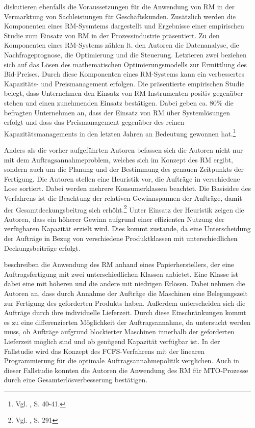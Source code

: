 \cite{kolisch2006revenue} diskutieren ebenfalls die Voraussetzungen für die Anwendung von RM in der Vermarktung von Sachleistungen für Geschäftskunden. Zusätzlich werden die Komponenten eines RM-Sysmtems dargestellt und Ergebnisse einer empirischen Studie zum Einsatz von RM in der Prozessindustrie präsentiert. Zu den Komponenten eines RM-Systems zählen lt. den Autoren die Datenanalyse, die Nachfrageprognose, die Optimierung und die Steuerung. Letzteren zwei beziehen sich auf das Lösen des mathematischen Optimierungsmodells zur Ermittlung des Bid-Preises. Durch diese Komponenten eines RM-Systems kann ein verbessertes Kapazitäts- und Preismanagement erfolgen. Die präsentierte empirischen Studie belegt, dass Unternehmen den Einsatz von RM-Instrumenten positiv gegenüber stehen und einen zunehmenden Einsatz bestätigen. Dabei geben ca. 80\% die befragten Unternehmen an, dass der Einsatz von RM über Systemlösungen erfolgt und dass das Preismanagement gegenüber des reinen Kapazitätsmanagements in den letzten Jahren an Bedeutung gewonnen hat.\footnote{Vgl. \cite{kolisch2006revenue}, S. 40-41.}

Anders als die vorher aufgeführten Autoren befassen sich die Autoren \cite{DECI:DECI074} nicht nur mit dem Auftragsannahmeproblem, welches sich im Konzept des RM ergibt, sondern auch um die Planung und der Bestimmung des genauen Zeitpunkts der Fertigung. Die Autoren stellen eine Heuristik vor, die Aufträge in verschiedene Lose sortiert. Dabei werden mehrere Konsumerklassen beachtet. Die Basisidee des Verfahrens ist die Beachtung der relativen Gewinnspannen der Aufträge, damit der Gesamtdeckungsbeitrag sich erhöht.\footnote{Vgl. \cite{DECI:DECI074}, S. 291} Unter Einsatz der Heuristik zeigen die Autoren, dass ein höherer Gewinn aufgrund einer effizienten Nutzung der verfügbaren Kapazität erzielt wird. Dies kommt zustande, da eine Unterscheidung der Aufträge in Bezug von verschiedene Produktklassen mit unterschiedlichen Deckungsbeiträge erfolgt. 

\cite{kuhn2004revenue} beschreiben die Anwendung des RM anhand eines Papierherstellers, der eine Auftragsfertigung mit zwei unterschiedlichen Klassen anbietet. Eine Klasse ist dabei eine mit höheren und die andere mit niedrigen Erlösen. Dabei nehmen die Autoren an, dass durch Annahme der Aufträge die Maschinen eine Belegungszeit zur Fertigung des geforderten Produkts haben. Außerdem unterscheiden sich die Aufträge durch ihre individuelle Lieferzeit. Durch diese Einschränkungen kommt es zu eine differenzierten Möglichkeit der Auftragsannahme, da untersucht werden muss, ob Aufträge aufgrund blockierter Maschinen innerhalb der geforderten Lieferzeit möglich sind und ob genügend Kapazität verfügbar ist. In der Fallstudie wird das Konzept des FCFS-Verfahrens mit der linearen Programmierung für die optimale Auftragsannahmepolitik verglichen. Auch in dieser Fallstudie konnten die Autoren die Anwendung des RM für MTO-Prozesse durch eine Gesamterlösverbesserung bestätigen.

